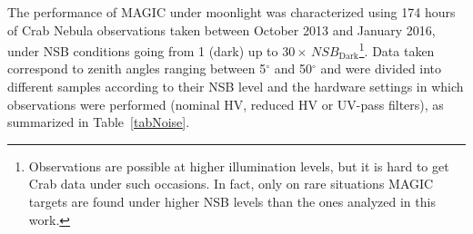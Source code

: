 \documentclass{PoS}
\begin{document}

The performance of MAGIC under moonlight was characterized using 174 hours of Crab Nebula observations taken between October 2013 and January 2016, under NSB conditions going from 1 (dark) up to $30 \times  \, \textit{NSB}_{\text{Dark}}$\footnote{Observations are possible at higher illumination levels, but it is hard to get Crab data under such occasions. In fact, only on rare situations MAGIC targets are found under higher NSB levels than the ones analyzed in this work.}. Data taken correspond to zenith angles ranging between 5$^\circ$ and 50$^\circ$
and were divided into different samples according to their NSB level and the hardware settings in which observations were performed (nominal HV, reduced HV or UV-pass filters), as summarized in Table~\ref{tabNoise}.
\end{document}
